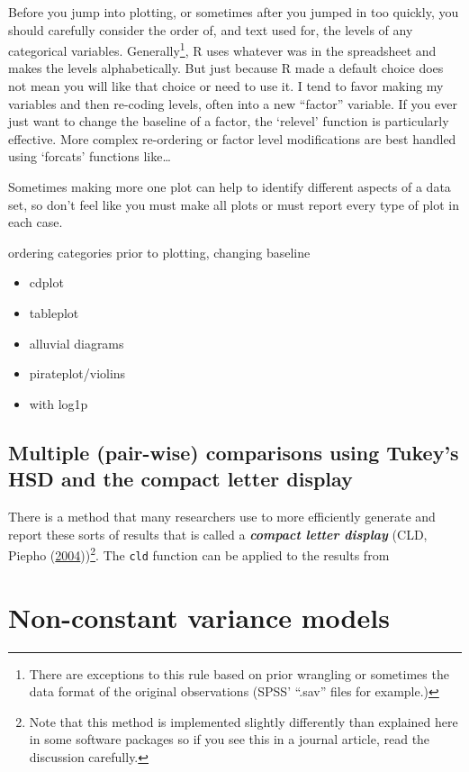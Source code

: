 \documentclass[
]{book}
\begin{document}
Before you jump into plotting, or sometimes after you jumped in too quickly, you should carefully consider the order of, and text used for, the levels of any categorical variables. Generally\footnote{There are exceptions to this rule based on prior wrangling or sometimes the data format of the original observations (SPSS' ``.sav'' files for example.)}, R uses whatever was in the spreadsheet and makes the levels alphabetically. But just because R made a default choice does not mean you will like that choice or need to use it. I tend to favor making my variables and then re-coding levels, often into a new ``factor'' variable. If you ever just want to change the baseline of a factor, the `relevel' function is particularly effective. More complex re-ordering or factor level modifications are best handled using `forcats' functions like\ldots{}

Sometimes making more one plot can help to identify different aspects of a data set, so don't feel like you must make all plots or must report every type of plot in each case.

ordering categories prior to plotting, changing baseline

\begin{itemize}
\item
  cdplot
\item
  tableplot
\item
  alluvial diagrams
\item
  pirateplot/violins
\item
  with log1p
\end{itemize}

\hypertarget{section5-5}{%
\section{Multiple (pair-wise) comparisons using Tukey's HSD and the compact letter display}\label{section5-5}}

\indent There is a method that many researchers use to more efficiently generate and
report these sorts of results that is called a \textbf{\emph{compact letter display}} 
(CLD, Piepho (\protect\hyperlink{ref-Piepho2004}{2004}))\footnote{Note that this method is implemented slightly differently than explained here in some software packages so if you see this in a journal article, read the discussion carefully.}. The \texttt{cld} function can be applied to the results from

\hypertarget{chapter6}{%
\chapter{Non-constant variance models}\label{chapter6}}
\end{document}
